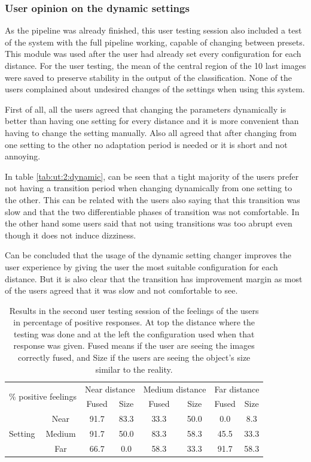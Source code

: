 \documentclass[10pt,a4paper,twocolumn,twoside]{article}
\begin{document}
	\subsubsection{User opinion on the dynamic settings}
	As the pipeline was already finished, this user testing session also included a test of the system with the full pipeline working, capable of changing between presets. This module was used after the user had already set every configuration for each distance.  
	For the user testing, the mean of the central region of the 10 last images were saved to preserve stability in the output of the classification. None of the users complained about undesired changes of the settings when using this system.  
	
	First of all, all the users agreed that changing the parameters dynamically is better than having one setting for every distance and it is more convenient than having to change the setting manually. Also all agreed that after changing from one setting to the other no adaptation period is needed or it is short and not annoying.  
	
	In table \ref{tab:ut:2:dynamic}, can be seen that a tight majority of the users prefer not having a transition period when changing dynamically from one setting to the other. This can be related with the users also saying that this transition was slow and that the two differentiable phases of transition  was not comfortable. In the other hand some users said that not using transitions was too abrupt even though it does not induce dizziness. 
	
	Can be concluded that the usage of the dynamic setting changer improves the user experience by giving the user the most suitable configuration for each distance. But it is also clear that the transition has improvement margin as most of the users agreed that it was slow and not comfortable to see.
	
	

	\begin{table}
		\centering
		\begin{tabular}{@{}lccccccc@{}}
			\toprule
			\multicolumn{2}{l}{\multirow{2}{*}{\% positive feelings}} & \multicolumn{2}{c}{Near distance} & \multicolumn{2}{c}{Medium distance} & \multicolumn{2}{c}{Far distance} \\
			\multicolumn{2}{l}{} & Fused & Size & Fused & Size & Fused & Size \\ \midrule
			\multirow{3}{*}{Setting} & Near & 91.7 & 83.3 & 33.3 & 50.0 & 0.0 & 8.3 \\
			& Medium & 91.7 & 50.0 & 83.3 & 58.3 & 45.5 & 33.3 \\
			& Far & 66.7 & 0.0 & 58.3 & 33.3 & 91.7 & 58.3 \\ \bottomrule
		\end{tabular}
		\caption{Results in the second user testing session of the feelings of the users in percentage of positive responses. At top the distance where the testing was done and at the left the configuration used when that response was given. Fused means if the user are seeing the images correctly fused, and Size if the users are seeing the object's size similar to the reality.}
		\label{tab:ut:2:feelings}
	\end{table}
\end{document}
